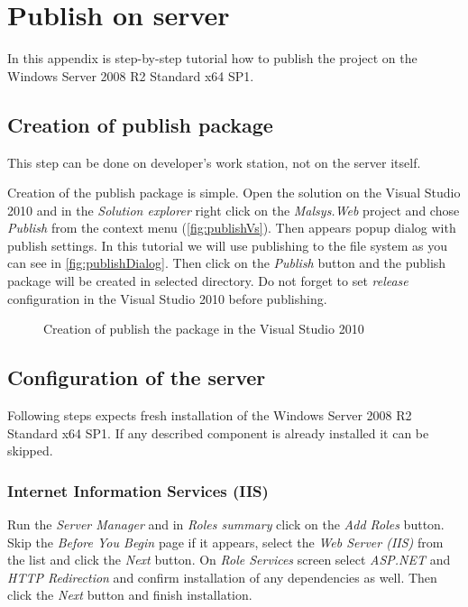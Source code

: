 
\chapter{Publish on server}
\label{chap:publish}

In this appendix is step-by-step tutorial how to publish the project on the Windows Server 2008 R2 Standard x64 SP1.

\section{Creation of publish package}
\label{sec:deployPackage}
This step can be done on developer's work station, not on the server itself.

Creation of the publish package is simple.
Open the solution on the Visual Studio 2010 and in the \emph{Solution explorer} right click on the \emph{Malsys.Web} project and chose \emph{Publish} from the context menu (\autoref{fig:publishVs}).
Then appears popup dialog with publish settings.
In this tutorial we will use publishing to the file system as you can see in \autoref{fig:publishDialog}.
Then click on the \emph{Publish} button and the publish package will be created in selected directory.
Do not forget to set \emph{release} configuration in the Visual Studio 2010 before publishing.

\begin{figure}[h!]
	\hfill
	\caption{Creation of publish the package in the Visual Studio 2010}
	\label{fig:publish}
\end{figure}
 
 

\section{Configuration of the server}

Following steps expects fresh installation of the Windows Server 2008 R2 Standard x64 SP1.
If any described component is already installed it can be skipped.


\subsection{Internet Information Services (IIS)}

Run the \emph{Server Manager} and in \emph{Roles summary} click on the \emph{Add Roles} button.
Skip the \emph{Before You Begin} page if it appears, select the \emph{Web Server (IIS)} from the list and click the \emph{Next} button.
On \emph{Role Services} screen select \emph{ASP.NET} and \emph{HTTP Redirection} and confirm installation of any dependencies as well.
Then click the \emph{Next} button and finish installation.


